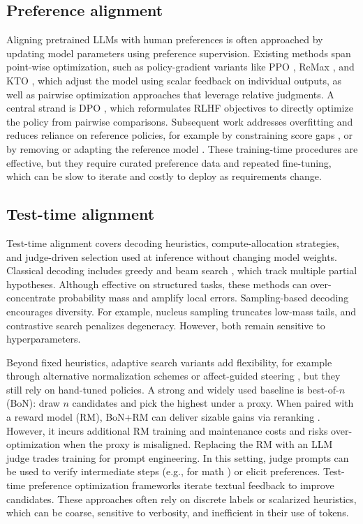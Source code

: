 \documentclass[letterpaper]{article} %
\begin{document}
\subsection{Preference alignment}
Aligning pretrained LLMs with human preferences is often approached by updating model parameters using preference supervision. Existing methods span point-wise optimization, such as policy-gradient variants like PPO \citep{schulman2017proximal}, ReMax \citep{li2024remax}, and KTO \citep{ethayarajh2024kto}, which adjust the model using scalar feedback on individual outputs, as well as pairwise optimization approaches that leverage relative judgments. A central strand is DPO \citep{rafailov2023direct}, which reformulates RLHF objectives to directly optimize the policy from pairwise comparisons. Subsequent work addresses overfitting and reduces reliance on reference policies, for example by constraining score gaps \citep{azar2023general}, or by removing or adapting the reference model \citep{meng2024simpo,kim2025sdpo,gorbatovski2024learn}. These training-time procedures are effective, but they require curated preference data and repeated fine-tuning, which can be slow to iterate and costly to deploy as requirements change.

\subsection{Test-time alignment}
Test-time alignment covers decoding heuristics, compute-allocation strategies, and judge-driven selection used at inference without changing model weights. Classical decoding includes greedy and beam search \citep{lowerre1976harpy}, which track multiple partial hypotheses. Although effective on structured tasks, these methods can over-concentrate probability mass and amplify local errors. Sampling-based decoding encourages diversity. For example, nucleus sampling \citep{holtzman2019curious} truncates low-mass tails, and contrastive search \citep{sucontrastive} penalizes degeneracy. However, both remain sensitive to hyperparameters.

Beyond fixed heuristics, adaptive search variants add flexibility, for example through alternative normalization schemes or affect-guided steering \citep{freitag2017beam,huang2023affective}, but they still rely on hand-tuned policies. A strong and widely used baseline is best-of-\(n\) (BoN): draw \(n\) candidates and pick the highest under a proxy. When paired with a reward model (RM), BoN+RM can deliver sizable gains via reranking \citep[e.g., human-feedback pipelines such as][]{stiennon2020learning}. However, it incurs additional RM training and maintenance costs and risks over-optimization when the proxy is misaligned. Replacing the RM with an LLM judge trades training for prompt engineering. In this setting, judge prompts can be used to verify intermediate steps (e.g., for math \citep{mahdavi2025scaling}) or elicit preferences. Test-time preference optimization frameworks \citep{litest} iterate textual feedback to improve candidates. These approaches often rely on discrete labels or scalarized heuristics, which can be coarse, sensitive to verbosity, and inefficient in their use of tokens.
\end{document}
